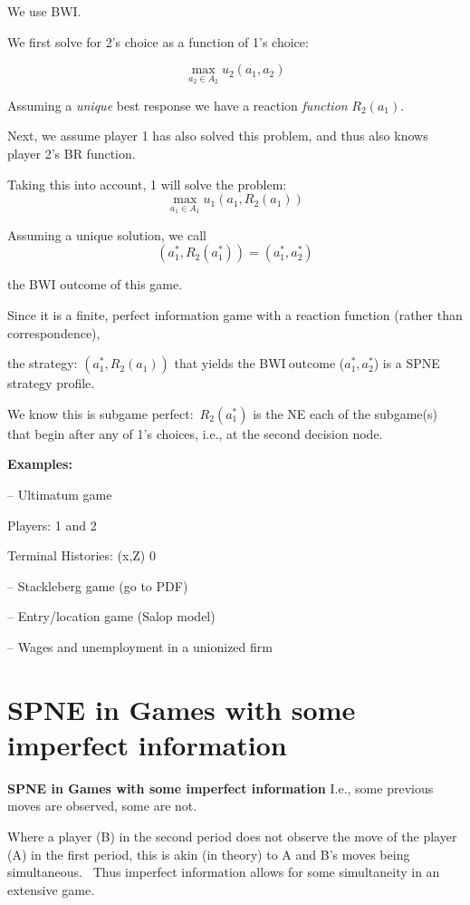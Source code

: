 We use BWI.

We first solve for 2's choice as a function of 1's choice:

\[
\max_{a_{2}\in A_{2}}u_{2}(a_{1},a_{2})
\]

Assuming a \textit{unique} best response we have a reaction \textit{function
}$R_{2}(a_{1})$.

Next, we assume player 1 has also solved this problem, and thus also knows
player 2's BR function. \

Taking this into account, 1 will solve the problem:
\[
\max_{a_{1}\in A_{1}}u_{1}(a_{1},R_{2}(a_{1}))
\]

Assuming a unique solution, we call
\[
(a_{1}^{\ast },R_{2}(a_{1}^{\ast }))=(a_{1}^{\ast },a_{2}^{\ast })
\]

the BWI outcome of this game.



Since it is a finite, perfect information game with a reaction function
(rather than correspondence),

the strategy: $(a_{1}^{\ast },R_{2}(a_{1}))$  that yields the BWI$\ $outcome
($a_{1}^{\ast },a_{2}^{\ast }$) is a SPNE strategy profile.

We know this is subgame perfect:\ $R_{2}(a_{1}^{\ast })$ is the NE each of
the subgame(s) that begin after any of 1's choices, i.e.,  at the second
decision node.


\textbf{Examples: }

-- Ultimatum game

Players: 1 and 2

Terminal Histories: (x,Z) 0

-- Stackleberg game (go to PDF)

-- Entry/location game (Salop model)

-- Wages and unemployment in a unionized firm


\section{SPNE in Games with some imperfect information}

\textbf{SPNE in Games with some imperfect information}
I.e., some previous moves are observed, some are not.


Where a player (B) in the second period does not observe the move of the
player (A) in the first period, this is akin (in theory) to A and B's moves
being simultaneous. \ Thus imperfect information allows for some
simultaneity in an extensive game.

